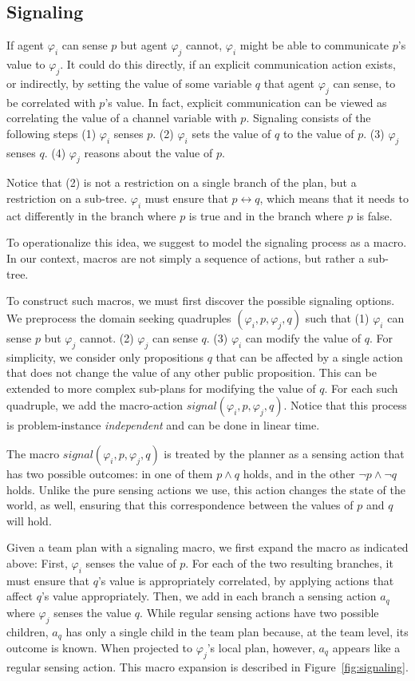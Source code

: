 \documentclass[letterpaper]{article}
\theoremstyle{definition}
\begin{document}
\subsection{Signaling}
\label{subsec:signal}
If agent $\varphi_i$ can sense $p$ but agent $\varphi_j$ cannot, $\varphi_i$ might be able to communicate $p$'s value to $\varphi_j$.
It could do this directly, if an explicit communication action exists, or indirectly, by setting the value of some variable $q$ that agent $\varphi_j$ can sense, to be correlated with $p$'s value.
In fact, explicit communication can be viewed as correlating the value of a channel variable with $p$.
Signaling consists of the following steps (1) $\varphi_i$ senses $p$. (2) $\varphi_i$ sets the value of $q$ to the value of $p$. (3)  $\varphi_j$ senses $q$. (4) $\varphi_j$ reasons about the value of $p$.

Notice that (2) is not a restriction on a single branch of the plan, but a restriction on a sub-tree. $\varphi_i$ must ensure that $p\leftrightarrow q$, which means that it needs to act differently in the
branch where $p$ is true and in the branch where $p$ is false.

To operationalize this idea, we suggest to model the signaling process as a macro.
In our context, macros are not simply
a sequence of actions, but rather a sub-tree.

To construct such macros, we must first discover the possible signaling options. We preprocess the domain seeking quadruples $(\varphi_i, p, \varphi_j, q)$ such that
(1) $\varphi_i$ can sense $p$ but $\varphi_j$ cannot. (2) $\varphi_j$ can sense $q$.
(3) $\varphi_i$ can modify the value of $q$.
For simplicity, we consider only propositions $q$ that can be affected by a single action that does not change the value of any other public proposition. This can be extended to more complex sub-plans for modifying the value of $q$.
For each such quadruple, we add the macro-action $signal(\varphi_i, p, \varphi_j, q)$. Notice that this process is problem-instance {\em independent} and can be done in linear time.


The macro $signal(\varphi_i, p, \varphi_j, q)$ is treated by the planner as a sensing action that has two possible outcomes: in one of them $p\wedge q$ holds, and in the other $\neg p\wedge \neg q$ holds. Unlike the pure sensing actions we use, this action changes the state of the world, as well, ensuring that this correspondence between the values of $p$ and $q$ will hold.

Given a team plan with a signaling macro, we first expand the macro as indicated above: First, $\varphi_i$ senses the value of $p$. For each of the two resulting branches, it must ensure that $q$'s value is appropriately correlated, by applying actions that affect $q$'s value appropriately. Then, we add in each branch a sensing action $a_q$ where $\varphi_j$ senses the value $q$. While regular sensing actions have two possible children, $a_q$ has only a single child in the team plan because, at the team level, its outcome is known.
When projected to $\varphi_j$'s local plan, however, $a_q$ appears like a regular sensing action. This macro expansion is described in Figure~\ref{fig:signaling}.
\end{document}
